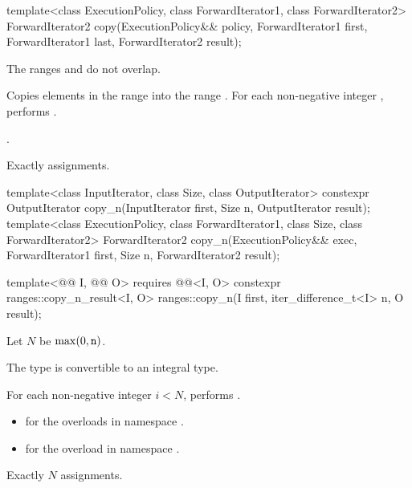 %
\begin{itemdecl}
template<class ExecutionPolicy, class ForwardIterator1, class ForwardIterator2>
  ForwardIterator2 copy(ExecutionPolicy&& policy,
                        ForwardIterator1 first, ForwardIterator1 last,
                        ForwardIterator2 result);
\end{itemdecl}

\begin{itemdescr}
\pnum
\expects
The ranges  and 
do not overlap.

\pnum
\effects
Copies elements in the range 
into the range .
For each non-negative integer ,
performs .

\pnum
\returns
{}.

\pnum
\complexity
Exactly  assignments.
\end{itemdescr}

%
\begin{itemdecl}
template<class InputIterator, class Size, class OutputIterator>
  constexpr OutputIterator copy_n(InputIterator first, Size n,
                                  OutputIterator result);
template<class ExecutionPolicy, class ForwardIterator1, class Size, class ForwardIterator2>
  ForwardIterator2 copy_n(ExecutionPolicy&& exec,
                          ForwardIterator1 first, Size n,
                          ForwardIterator2 result);

template<@@ I, @@ O>
  requires @@<I, O>
  constexpr ranges::copy_n_result<I, O>
    ranges::copy_n(I first, iter_difference_t<I> n, O result);
\end{itemdecl}

\begin{itemdescr}
\pnum
Let $N$ be $\max(0, \texttt{\protect n})$.

\pnum
\mandates
The type  is convertible
to an integral type.

\pnum
\effects
For each non-negative integer $i < N$,
performs .

\pnum
\returns
\begin{itemize}
\item
  for the overloads in namespace .
\item
  for the overload in namespace .
\end{itemize}

\pnum
\complexity
Exactly $N$ assignments.
\end{itemdescr}

